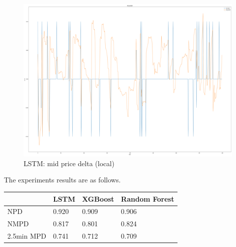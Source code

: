 \documentclass[10pt, conference, compsocconf]{IEEEtran}
\begin{document}
\begin{figure}[ht]
	\centering
	\includegraphics[scale=0.7]{lstm_mid_price_delta_local.png}
	\caption{LSTM: mid price delta (local)} \label{fig 6B}
\end{figure}



The experiments results are as follows.\\

\begin{tabular}{|l|l|l|l|}
	\hline
	& LSTM & XGBoost & Random Forest\\
	\hline
	NPD & 0.920 & 0.909 & 0.906\\
	\hline
	NMPD & 0.817 & 0.801 & 0.824\\
	\hline
	2.5min MPD & 0.741 & 0.712 & 0.709\\
	\hline
\end{tabular}

\end{document}
